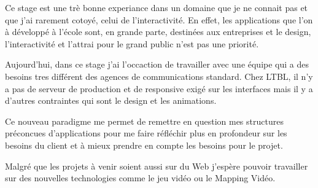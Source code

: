 \documentclass{article}
\begin{document}
Ce stage est une trè bonne experiance dans un domaine que je ne connait pas et que j'ai rarement cotoyé, celui de l'interactivité.
En effet, les applications que l'on à développé à l'école sont, en grande parte, destinées aux entreprises et le design, l'interactivité et l'attrai pour le grand public n'est pas une priorité.

Aujourd'hui, dans ce stage j'ai l'occaction de travailler avec une équipe qui a des besoins tres différent des agences de communications standard.
Chez LTBL, il n'y a pas de serveur de production et de responsive exigé sur les interfaces mais il y a d'autres contraintes qui sont le design et les animations.

Ce nouveau paradigme me permet de remettre en question mes structures préconcues d'applications pour me faire réfléchir plus en profondeur sur les besoins du client et à mieux prendre en compte les besoins pour le projet.

Malgré que les projets à venir soient aussi sur du Web j'espère pouvoir travailler sur des nouvelles technologies comme le jeu vidéo ou le Mapping Vidéo.
\end{document}

